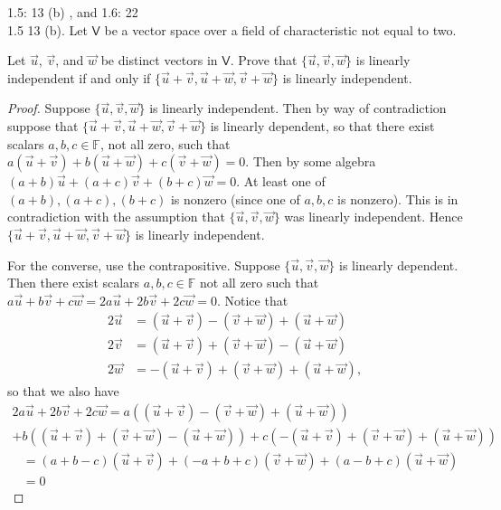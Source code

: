 \documentclass[11pt]{article}
\newcommand{\br}[1]{\left(#1\right)}
\newcommand{\cbr}[1]{\{#1\}}
\begin{document}
1.5: 13 (b) , and 1.6: 22 \\

1.5 13 (b). Let $\mathsf{V}$ be a vector space over a field of characteristic not equal to two.

Let $\vec{u}$, $\vec{v}$, and $\vec{w}$ be distinct vectors in $\mathsf{V}$. Prove that $\cbr{\vec{u},\vec{v},\vec{w}}$ is linearly independent if and only if $\cbr{\vec{u}+\vec{v},\vec{u}+\vec{w},\vec{v}+\vec{w}}$ is linearly independent.

\begin{proof}
    Suppose $\cbr{\vec{u},\vec{v},\vec{w}}$ is linearly independent. Then by way of contradiction suppose that $\cbr{\vec{u}+\vec{v},\vec{u}+\vec{w},\vec{v}+\vec{w}}$ is linearly dependent, so that there exist scalars $a,b,c\in\mathbb{F}$, not all zero, such that $a(\vec{u}+\vec{v})+b(\vec{u}+\vec{w})+c(\vec{v}+\vec{w}) = 0$. Then by some algebra $\br{a+b}\vec{u} + \br{a+c}\vec{v} + \br{b+c}\vec{w} = 0$. At least one of $\br{a+b}, \br{a+c}, \br{b+c}$ is nonzero (since one of $a,b,c$ is nonzero). This is in contradiction with the assumption that $\cbr{\vec{u},\vec{v},\vec{w}}$ was linearly independent. Hence $\cbr{\vec{u}+\vec{v},\vec{u}+\vec{w},\vec{v}+\vec{w}}$ is linearly independent.

    For the converse, use the contrapositive. Suppose $\cbr{\vec{u},\vec{v},\vec{w}}$ is linearly dependent. Then there exist scalars $a,b,c\in\mathbb{F}$ not all zero such that $a\vec{u}+b\vec{v}+c\vec{w} = 2a\vec{u}+2b\vec{v}+2c\vec{w} = 0$. Notice that 
    \begin{align*}
        2\vec{u} &= \br{\vec{u}+\vec{v}}-\br{\vec{v}+\vec{w}}+\br{\vec{u}+\vec{w}} \\
        2\vec{v} &= \br{\vec{u}+\vec{v}}+\br{\vec{v}+\vec{w}}-\br{\vec{u}+\vec{w}} \\
        2\vec{w} &= -\br{\vec{u}+\vec{v}}+\br{\vec{v}+\vec{w}}+\br{\vec{u}+\vec{w}},
    \end{align*}
    so that we also have
    \begin{multline*}
        2a\vec{u}+2b\vec{v}+2c\vec{w} = a\br{\br{\vec{u}+\vec{v}}-\br{\vec{v}+\vec{w}}+\br{\vec{u}+\vec{w}}} \\+ b\br{\br{\vec{u}+\vec{v}}+\br{\vec{v}+\vec{w}}-\br{\vec{u}+\vec{w}}} + c\br{-\br{\vec{u}+\vec{v}}+\br{\vec{v}+\vec{w}}+\br{\vec{u}+\vec{w}}} 
    \end{multline*}
    \begin{align*}
        &= \br{a+b-c}\br{\vec{u}+\vec{v}} + \br{-a+b+c}\br{\vec{v}+\vec{w}} + \br{a-b+c}\br{\vec{u}+\vec{w}}\\
        &= 0
    \end{align*}


\end{proof}
\end{document}

